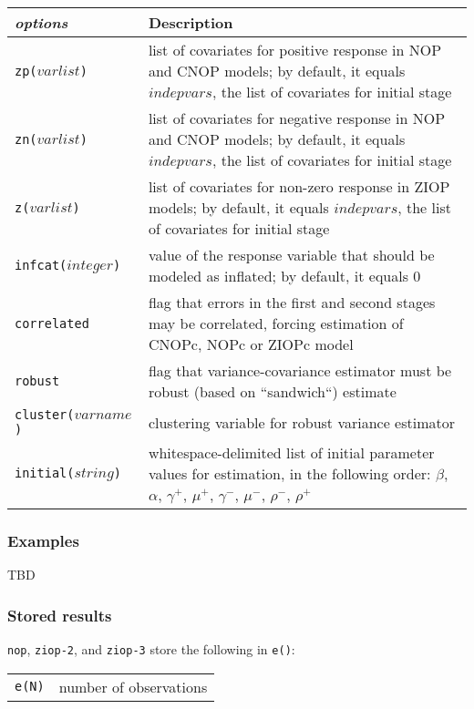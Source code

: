 \documentclass[letterpaper,fleqn,12pt]{article}
\begin{document}
\begin{onehalfspace}
\begin{tabular}{lp{12cm}}
\textit{options} & Description \\ 
\midrule \texttt{zp($varlist$)} & list of covariates for positive response
in NOP and CNOP models; by default, it equals $indepvars$, the list of
covariates for initial stage \\ 
\texttt{zn($varlist$)} & list of covariates for negative response in NOP and
CNOP models; by default, it equals $indepvars$, the list of covariates for
initial stage \\ 
\texttt{z($varlist$)} & list of covariates for non-zero response in ZIOP
models; by default, it equals $indepvars$, the list of covariates for
initial stage \\ 
\texttt{infcat($integer$)} & value of the response variable that should be
modeled as inflated; by default, it equals 0 \\ 
\texttt{correlated} & flag that errors in the first and second stages may be
correlated, forcing estimation of CNOPc, NOPc or ZIOPc model \\ 
\texttt{robust} & flag that variance-covariance estimator must be robust
(based on ``sandwich``) estimate \\ 
\texttt{cluster($varname$)} & clustering variable for robust variance
estimator \\ 
\texttt{initial($string$)} & whitespace-delimited list of initial parameter
values for estimation, in the following order: $\beta$, $\alpha$, $%
\gamma^{+} $, $\mu^{+}$, $\gamma^{-}$, $\mu^{-}$, $\rho^{-}$, $\rho^{+}$%
\end{tabular}

\subsubsection*{Examples}

TBD

\subsubsection*{Stored results}

\texttt{nop}, \texttt{ziop-2}, and \texttt{ziop-3} store the following in 
\texttt{e()}:


\begin{tabular}{p{3cm}p{12cm}}
\texttt{e(N)} & number of observations%
\end{tabular}



\end{onehalfspace}
\end{document}
